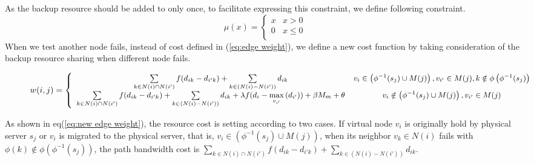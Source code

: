 As the backup resource should be added to only once, to facilitate expressing  this constraint, we define following constraint.
\begin{equation}
\mu (x) = \left\{ {\begin{array}{*{20}{c}}
   x & {x > 0}  \\
   0 & {x \le 0}  \\
\end{array}} \right.
\end{equation}
When we test another node fails, instead of cost defined in (\ref{eq:edge weight}), we define a new cost function by taking consideration of the backup resource sharing when different node fails.
\begin{figure*}
  \centering
    \begin{equation}
  \footnotesize
w(i,j) = \left\{ {\begin{array}{*{20}{c}}
   {\sum\limits_{k \in N(i) \cap N(i')} {f({d_{ik}} - {d_{i'k}})}  + \sum\limits_{k \in \left( {N(i) - N(i')} \right)} {{d_{ik}}} } & {{v_i} \in \left( {{\phi ^{ - 1}}({s_j}) \cup M(j)} \right),{v_{i'}} \in M(j),k \notin \phi \left( {{\phi ^{ - 1}}({s_j})} \right)}  \\
   {\sum\limits_{k \in N(i) \cap N(i')} {f({d_{ik}} - {d_{i'k}})}  + \sum\limits_{k \in \left( {N(i) - N(i')} \right)} {{d_{ik}}}  + \lambda f({d_i} - \mathop {\max }\limits_{{v_{i'}}} \left( {{d_{i'}}} \right)) + \beta {M_m} + \theta } & {{v_i} \notin \left( {{\phi ^{ - 1}}({s_j}) \cup M(j)} \right),{v_{i'}} \in M(j)}  \\
\end{array}} \right.
    \label{eq:new edge weight}
    \end{equation}
\end{figure*}

As shown in  eq(\ref{eq:new edge weight}), the resource cost is setting according to two cases.  If virtual node $v_i$ is originally hold by  physical server $s_j$ or $v_i$ is migrated to the physical server, that is, ${{v_i} \in \left( {{\phi ^{ - 1}}({s_j}) \cup M(j)} \right)}$, when its neighbor $v_k \in N(i)$ fails with ${\phi \left( k \right) \notin \phi \left( {{\phi ^{ - 1}}({s_j})} \right)}$, the path bandwidth cost is ${\sum\limits_{k \in N(i) \cap N(i')} {f({d_{ik}} - {d_{i'k}})}  + \sum\limits_{k \in \left( {N(i) - N(i')} \right)} {{d_{ik}}} }$.

